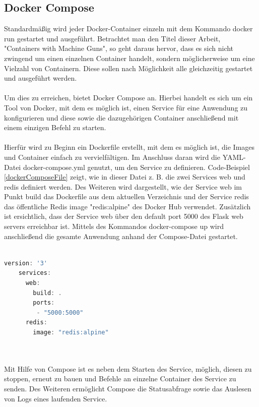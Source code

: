 \subsection{Docker Compose}
Standardmäßig wird jeder Docker-Container einzeln mit dem Kommando docker run gestartet und ausgeführt. Betrachtet man den Titel dieser Arbeit, "Containers with Machine Guns", so geht daraus hervor, dass es sich nicht zwingend um einen einzelnen Container handelt, sondern möglicherweise um eine Vielzahl von Containern. Diese sollen nach Möglichkeit alle gleichzeitig gestartet und ausgeführt werden.
\\\\
Um dies zu erreichen, bietet Docker Compose an. Hierbei handelt es sich um ein Tool von Docker, mit dem es möglich ist, einen Service für eine Anwendung zu konfigurieren und diese sowie die dazugehörigen Container anschließend mit einem einzigen Befehl zu starten.
\\\\
Hierfür wird zu Beginn ein Dockerfile erstellt, mit dem es möglich ist, die Images und Container einfach zu vervielfältigen. Im Anschluss daran wird die YAML-Datei docker-compose.yml genutzt, um den Service zu definieren. Code-Beispiel \ref{dockerComposeFile} zeigt, wie in dieser Datei z. B. die zwei Services web und redis definiert werden. Des Weiteren wird dargestellt, wie der Service web im Punkt build das Dockerfile aus dem aktuellen Verzeichnis und der Service redis das öffentliche Redis image "redis:alpine" des Docker Hub verwendet. Zusätzlich ist ersichtlich, dass der Service web über den default port 5000 des Flask web servers erreichbar ist. Mittels des Kommandos docker-compose up wird anschließend die gesamte Anwendung anhand der Compose-Datei gestartet.
\\\\
\begin{minipage}{\linewidth}
	\begin{lstlisting}[frame=single,caption=Beispiel Docker Compose Datei, label=dockerComposeFile, language=Scala]
	version: '3'
	services:
	  web:
	    build: .
	    ports:
	     - "5000:5000"
	  redis:
	    image: "redis:alpine"
	\end{lstlisting}
\end{minipage}
\\\\
Mit Hilfe von Compose ist es neben dem Starten des Service, möglich, diesen zu stoppen, erneut zu bauen und Befehle an einzelne Container des Service zu senden. Des Weiteren ermöglicht Compose die Statusabfrage sowie das Auslesen von Logs eines laufenden Service.
